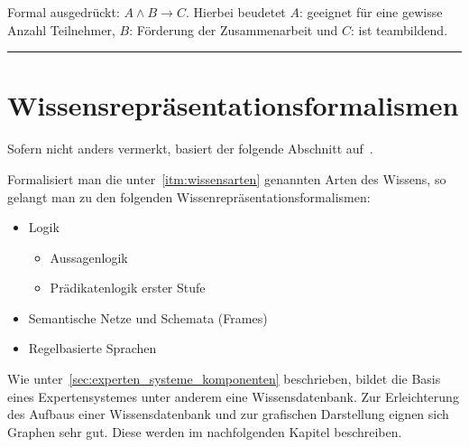 Formal ausgedrückt: $A \wedge B \rightarrow C$. Hierbei beudetet $A$: geeignet für eine gewisse Anzahl Teilnehmer, $B$: Förderung der Zusammenarbeit und $C$: ist teambildend.\\

\noindent\rule[1ex]{\textwidth}{1pt}

\section{Wissensrepräsentationsformalismen}
\label{sec:wissensrepräsentationsformalismen}
Sofern nicht anders vermerkt, basiert der folgende Abschnitt auf~\cite[S. 32]{laemmel}.

Formalisiert man die unter~\ref{itm:wissensarten} genannten Arten des Wissens, so gelangt man zu den folgenden Wissenrepräsentationsformalismen:
\begin{itemize}
    \item Logik
        \begin{itemize}
            \item Aussagenlogik
            \item Prädikatenlogik erster Stufe
        \end{itemize}
    \item Semantische Netze und Schemata (Frames)
    \item Regelbasierte Sprachen
\end{itemize}

Wie unter~\ref{sec:experten_systeme_komponenten} beschrieben, bildet die Basis eines Expertensystemes unter anderem eine Wissensdatenbank. Zur Erleichterung des Aufbaus einer Wissensdatenbank und zur grafischen Darstellung eignen sich Graphen sehr gut. Diese werden im nachfolgenden Kapitel beschreiben.
